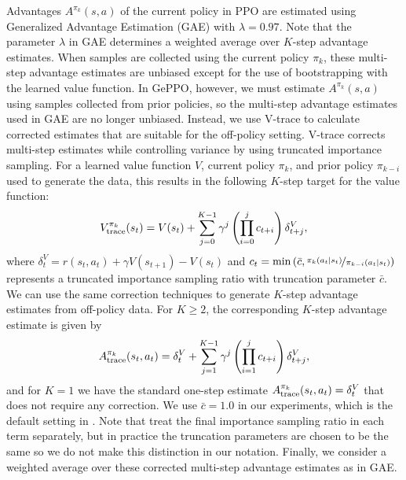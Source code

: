 \documentclass{article}
\begin{document}
Advantages $A^{\pi_k}(s,a)$ of the current policy in PPO are estimated using Generalized Advantage Estimation (GAE) \citep{schulman_2016} with $\lambda = 0.97$. Note that the parameter $\lambda$ in GAE determines a weighted average over $K$-step advantage estimates. When samples are collected using the current policy $\pi_k$, these multi-step advantage estimates are unbiased except for the use of bootstrapping with the learned value function. In GePPO, however, we must estimate $A^{\pi_k}(s,a)$ using samples collected from prior policies, so the multi-step advantage estimates used in GAE are no longer unbiased. Instead, we use V-trace \citep{espeholt_2018} to calculate corrected estimates that are suitable for the off-policy setting. V-trace corrects multi-step estimates while controlling variance by using truncated importance sampling. For a learned value function $V$, current policy $\pi_k$, and prior policy $\pi_{k-i}$ used to generate the data, this results in the following $K$-step target for the value function:
\begin{equation}
V^{\pi_k}_{\textnormal{trace}}(s_t) = V(s_t) + \sum_{j=0}^{K-1} \gamma^j \left( \prod_{i=0}^j c_{t+i} \right) \delta_{t+j}^V,
\end{equation}
where $\delta_{t}^V = r(s_{t},a_{t}) + \gamma V(s_{t+1}) - V(s_{t})$ and $c_{t} = \min \left( \bar{c}, \nicefrac{\pi_k (a_{t} \mid s_{t} )}{\pi_{k-i} (a_{t} \mid s_{t} )  } \right)$ represents a truncated importance sampling ratio with truncation parameter $\bar{c}$. We can use the same correction techniques to generate $K$-step advantage estimates from off-policy data. For $K \geq 2$, the corresponding $K$-step advantage estimate is given by
\begin{equation}
A^{\pi_k}_{\textnormal{trace}}(s_t,a_t) = \delta_{t}^V + \sum_{j=1}^{K-1} \gamma^j \left( \prod_{i=1}^j c_{t+i} \right) \delta_{t+j}^V,
\end{equation}
and for $K=1$ we have the standard one-step estimate $A^{\pi_k}_{\textnormal{trace}}(s_t,a_t) = \delta_{t}^V$ that does not require any correction. We use $\bar{c}=1.0$ in our experiments, which is the default setting in \citet{espeholt_2018}. Note that \citet{espeholt_2018} treat the final importance sampling ratio in each term separately, but in practice the truncation parameters are chosen to be the same so we do not make this distinction in our notation. Finally, we consider a weighted average over these corrected multi-step advantage estimates as in GAE.
\end{document}
